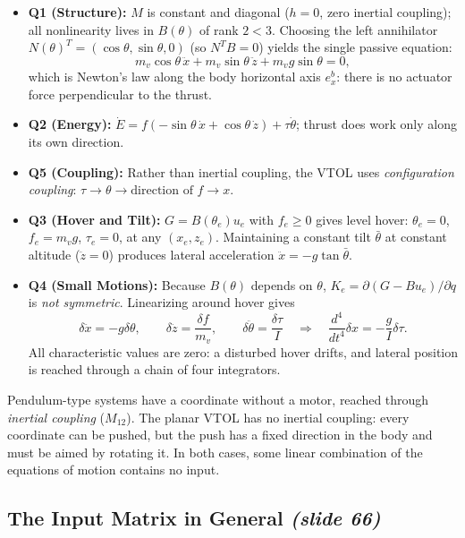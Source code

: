 \documentclass[11pt, a4paper]{article}
\theoremstyle{definition}
\theoremstyle{plain}
\begin{document}
\begin{itemize}
  \item \textbf{Q1 (Structure):} $M$ is constant and diagonal ($h = 0$, zero inertial coupling); all nonlinearity lives in $B(\theta)$ of rank $2 < 3$. Choosing the left annihilator $N(\theta)^T = (\cos\theta, \sin\theta, 0)$ (so $N^T B = 0$) yields the single passive equation:
  \[
    m_v \cos\theta\,\ddot{x} + m_v \sin\theta\,\ddot{z} + m_v g \sin\theta = 0,
  \]
  which is Newton's law along the body horizontal axis $e_x^b$: there is no actuator force perpendicular to the thrust.
  \item \textbf{Q2 (Energy):} $\dot{E} = f(-\sin\theta\,\dot{x} + \cos\theta\,\dot{z}) + \tau\dot{\theta}$; thrust does work only along its own direction.
  \item \textbf{Q5 (Coupling):} Rather than inertial coupling, the VTOL uses \emph{configuration coupling}: $\tau \to \theta \to \text{direction of } f \to x$.
  \item \textbf{Q3 (Hover and Tilt):} $G = B(\theta_e)u_e$ with $f_e \ge 0$ gives level hover: $\theta_e = 0$, $f_e = m_v g$, $\tau_e = 0$, at any $(x_e, z_e)$. Maintaining a constant tilt $\bar{\theta}$ at constant altitude ($\ddot{z}=0$) produces lateral acceleration $\ddot{x} = -g\tan\bar{\theta}$.
  \item \textbf{Q4 (Small Motions):} Because $B(\theta)$ depends on $\theta$, $K_e = \partial(G - B u_e)/\partial q$ is \emph{not symmetric}. Linearizing around hover gives
  \[
    \delta\ddot{x} = -g\delta\theta, \qquad \delta\ddot{z} = \frac{\delta f}{m_v}, \qquad \delta\ddot{\theta} = \frac{\delta\tau}{I}
    \quad\Longrightarrow\quad
    \frac{d^4}{dt^4}\delta x = -\frac{g}{I}\delta\tau.
  \]
  All characteristic values are zero: a disturbed hover drifts, and lateral position is reached through a chain of four integrators.
\end{itemize}

\begin{intuition}
Pendulum-type systems have a coordinate without a motor, reached through \emph{inertial coupling} ($M_{12}$). The planar VTOL has no inertial coupling: every coordinate can be pushed, but the push has a fixed direction in the body and must be aimed by rotating it. In both cases, some linear combination of the equations of motion contains no input.
\end{intuition}

\subsection{The Input Matrix in General \emph{(slide 66)}}
\end{document}
